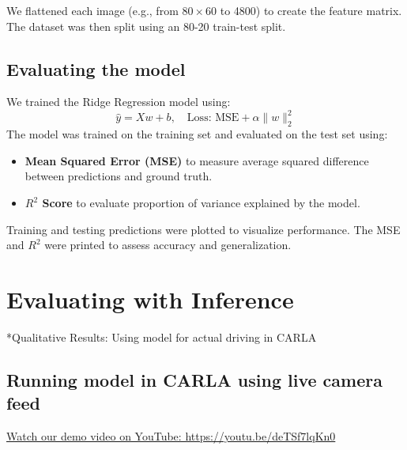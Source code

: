 \documentclass{article} %
\begin{document}
We flattened each image (e.g., from $80 \times 60$ to 4800) to create the feature matrix. The dataset was then split using an 80-20 train-test split.


\subsection{Evaluating the model}

We trained the Ridge Regression model using:
\[
\hat{y} = Xw + b, \quad \text{Loss: } \text{MSE} + \alpha \|w\|_2^2
\]
The model was trained on the training set and evaluated on the test set using:
\begin{itemize}
  \item \textbf{Mean Squared Error (MSE)} to measure average squared difference between predictions and ground truth.
  \item \textbf{\(R^2\) Score} to evaluate proportion of variance explained by the model.
\end{itemize}

Training and testing predictions were plotted to visualize performance. The MSE and $R^2$ were printed to assess accuracy and generalization.



\section{Evaluating with Inference}

*Qualitative Results: Using model for actual driving in CARLA

\subsection{Running model in CARLA using live camera feed}

\href{https://youtu.be/deTSf7lqKn0}{Watch our demo video on YouTube: https://youtu.be/deTSf7lqKn0}
\end{document}
